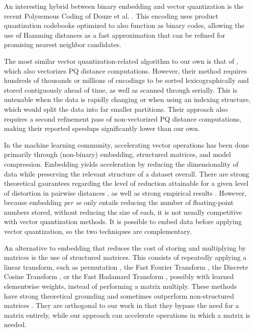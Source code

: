 An interesting hybrid between binary embedding and vector quantization is the recent Polysemous Coding of Douze et al. \cite{polysemous}. This encoding uses product quantization codebooks optimized to also function as binary codes, allowing the use of Hamming distances as a fast approximation that can be refined for promising nearest neighbor candidates. %

The most similar vector quantization-related algorithm to our own is that of \cite{simdpq}, which also vectorizes PQ distance computations. However, their method requires hundreds of thousands or millions of encodings to be sorted lexicographically and stored contiguously ahead of time, as well as scanned through serially. This is untenable when the data is rapidly changing or when using an indexing structure, which would split the data into far smaller partitions. Their approach also requires a second refinement pass of non-vectorized PQ distance computations, making their reported speedups significantly lower than our own.

In the machine learning community, accelerating vector operations has been done primarily through (non-binary) embedding, structured matrices, and model compression. Embedding yields acceleration by reducing the dimensionality of data while preserving the relevant structure of a dataset overall. There are strong theoretical gaurantees regarding the level of reduction attainable for a given level of distortion in pairwise distances \cite{jl, fastJL, jlIsTight}, as well as strong empirical results \cite{superBitLSH, compressiveMining}. However, because embedding \textit{per se} only entails reducing the number of floating-point numbers stored, without reducing the size of each, it is not usually competitive with vector quantization methods. It is possible to embed data before applying vector quantization, so the two techniques are complementary.

An alternative to embedding that reduces the cost of storing and multiplying by matrices is the use of structured matrices. This consists of repeatedly applying a linear transform, such as permutation \cite{adaptiveFastfood}, the Fast Fourier Transform \cite{orthogonalRandomFeatures}, the Discrete Cosine Transform \cite{acdc}, or the Fast Hadamard Transform \cite{crosspolytopeLSH, structuredSpinners}, possibly with learned elementwise weights, instead of performing a matrix multiply. These methods have strong theoretical grounding \cite{structuredSpinners} and sometimes outperform non-structured matrices \cite{adaptiveFastfood}. They are orthogonal to our work in that they bypass the need for a matrix entirely, while our approach can accelerate operations in which a matrix is needed.

